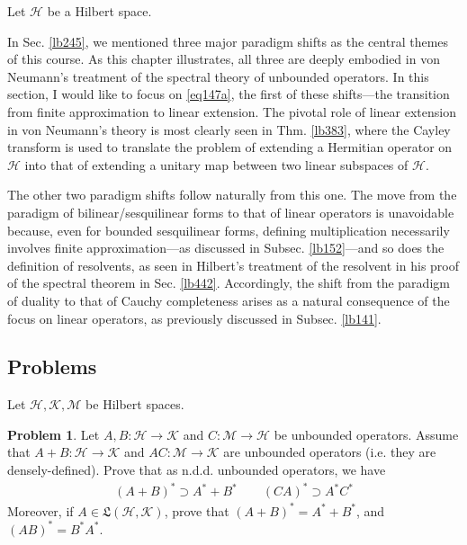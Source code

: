 \documentclass[12pt,b5paper,notitlepage]{article}
\theoremstyle{definition}
\newtheorem{prob}{\color{red}Problem}[section]
\theoremstyle{plain}
\newcommand{\fk}{\mathfrak}
\newcommand{\MH}{\mathcal H}
\newcommand{\MK}{\mathcal K}
\newcommand{\MM}{\mathcal M}
\numberwithin{equation}{section}
\begin{document}
Let $\MH$ be a Hilbert space.

In Sec. \ref{lb245}, we mentioned three major paradigm shifts as the central themes of this course. As this chapter illustrates, all three are deeply embodied in von Neumann's treatment of the spectral theory of unbounded operators. In this section, I would like to focus on \eqref{eq147a}, the first of these shifts---the transition from finite approximation to linear extension. The pivotal role of linear extension in von Neumann's theory is most clearly seen in Thm. \ref{lb383}, where the Cayley transform is used to translate the problem of extending a Hermitian operator on $\MH$ into that of extending a unitary map between two linear subspaces of $\MH$.

The other two paradigm shifts follow naturally from this one. The move from the paradigm of bilinear/sesquilinear forms to that of linear operators is unavoidable because, even for bounded sesquilinear forms, defining multiplication necessarily involves finite approximation—as discussed in Subsec. \ref{lb152}—and so does the definition of resolvents, as seen in Hilbert’s treatment of the resolvent in his proof of the spectral theorem in Sec. \ref{lb442}. Accordingly, the shift from the paradigm of duality to that of Cauchy completeness arises as a natural consequence of the focus on linear operators, as previously discussed in Subsec. \ref{lb141}.

















\hypertarget{current}{}

\subsection{Problems}


Let $\MH,\MK,\MM$ be Hilbert spaces.


\begin{prob}\label{lb405}
Let $A,B:\MH\rightarrow\MK$ and $C:\MM\rightarrow\MH$ be unbounded operators. Assume that $A+B:\MH\rightarrow\MK$ and $AC:\MM\rightarrow\MK$ are unbounded operators (i.e. they are densely-defined). Prove that as n.d.d. unbounded operators, we have
\begin{align*}
(A+B)^*\supset A^*+B^*\qquad (CA)^*\supset A^*C^*
\end{align*}
Moreover, if $A\in\fk L(\MH,\MK)$, prove that $(A+B)^*=A^*+B^*$, and $(AB)^*=B^*A^*$. 
\end{prob}
\end{document}
